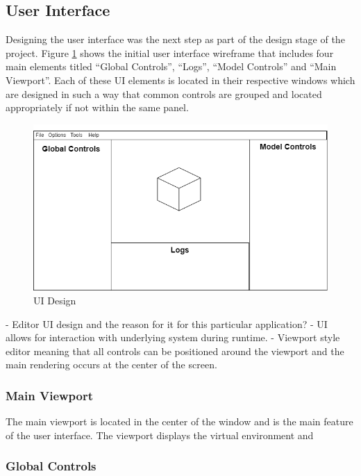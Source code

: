 \documentclass[11pt]{article}
\begin{document}
\subsection{User Interface}
Designing the user interface was the next step as part of the design stage of
the project. Figure \ref{fig:ui_design} shows the initial user interface
wireframe that includes four main elements titled ``Global Controls'', ``Logs'',
``Model Controls'' and ``Main Viewport''. Each of these UI elements is located
in their respective windows which are designed in such a way that common
controls are grouped and located appropriately if not within the same panel.

\begin{figure}[ht]
  \centering
  \includegraphics[width=\textwidth]{images/ui_design.png}
  \caption{UI Design}
  \label{fig:ui_design}
\end{figure}


- Editor UI design and the reason for it for this particular application?
-   UI allows for interaction with underlying system during runtime.
-   Viewport style editor meaning that all controls can be positioned
    around the viewport and the main rendering occurs at the center of
    the screen.

\subsubsection{Main Viewport}
The main viewport is located in the center of the window and is the main feature
of the user interface. The viewport displays the virtual environment and 

\subsubsection{Global Controls}
\end{document}
